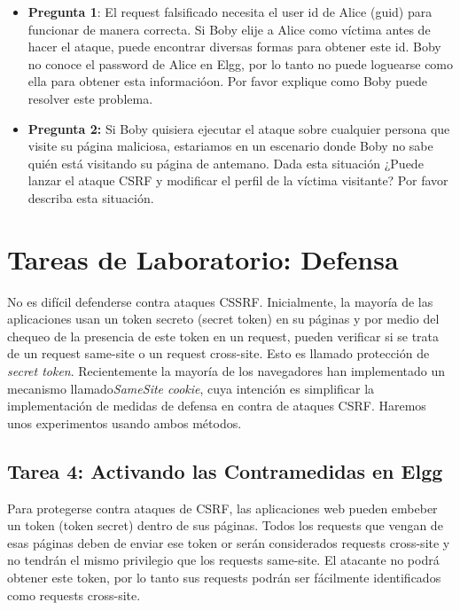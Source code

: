 \begin{itemize}
   \item \textbf{Pregunta 1}: El request falsificado necesita el user id de Alice (guid) para funcionar de manera correcta. Si Boby elije a Alice como víctima antes de hacer el ataque, puede encontrar diversas formas para obtener este id. Boby no conoce el password de Alice en Elgg, por lo tanto no puede loguearse como ella para obtener esta informacióon. Por favor explique como Boby puede resolver este problema.

   \item \textbf{Pregunta 2:} Si Boby quisiera ejecutar el ataque sobre cualquier persona que visite su página maliciosa, estariamos en un escenario donde Boby no sabe quién está visitando su página de antemano. Dada esta situación ¿Puede lanzar el ataque CSRF y modificar el perfil de la víctima visitante? Por favor describa esta situación.
\end{itemize}


\section{Tareas de Laboratorio: Defensa} 

No es difícil defenderse contra ataques CSSRF. Inicialmente, la mayoría de las aplicaciones usan un token secreto (secret token) en su páginas y por medio del chequeo de la presencia de este token en un request, pueden verificar si se trata de un request same-site o un request cross-site. Esto es llamado protección de  \textit{secret token}.
Recientemente la mayoría de los navegadores han implementado un mecanismo llamado\textit{SameSite cookie}, cuya intención es simplificar la implementación de medidas de defensa en contra de ataques CSRF.
Haremos unos experimentos usando ambos métodos. 


\subsection{Tarea 4: Activando las Contramedidas en Elgg} 

Para protegerse contra ataques de CSRF, las aplicaciones web pueden embeber un token (token secret) dentro de sus páginas. Todos los requests que vengan de esas páginas deben de enviar ese token or serán considerados requests cross-site y no tendrán el mismo privilegio que los requests same-site. El atacante no podrá obtener este token, por lo tanto sus requests podrán ser fácilmente identificados como requests cross-site.

